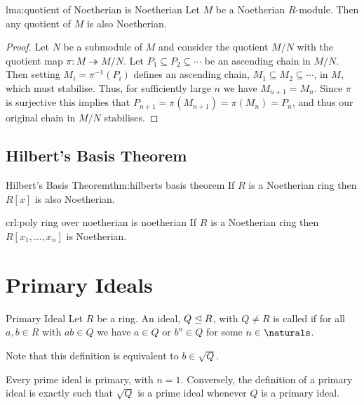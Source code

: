 \begin{lma}{}{lma:quotient of Noetherian is Noetherian}
    Let \(M\) be a Noetherian \(R\)-module.
    Then any quotient of \(M\) is also Noetherian.
    \begin{proof}
        Let \(N\) be a submodule of \(M\) and consider the quotient \(M/N\) with the quotient map \(\pi \colon M \twoheadrightarrow M/N\).
        Let \(P_1 \subseteq P_2 \subseteq \dotsb\) be an ascending chain in \(M/N\).
        Then setting \(M_i = \pi^{-1}(P_i)\) defines an ascending chain, \(M_1 \subseteq M_2 \subseteq \dotsb\), in \(M\), which must stabilise.
        Thus, for sufficiently large \(n\) we have \(M_{n+1} = M_n\).
        Since \(\pi\) is surjective this implies that \(P_{n+1} = \pi(M_{n+1}) = \pi(M_n) = P_n\), and thus our original chain in \(M/N\) stabilises.
    \end{proof}
\end{lma}

\subsection{Hilbert's Basis Theorem}
\begin{thm}{Hilbert's Basis Theorem}{thm:hilberts basis theorem}
    If \(R\) is a Noetherian ring then \(R[x]\) is also Noetherian.
\end{thm}

\begin{crl}{}{crl:poly ring over noetherian is noetherian}
    If \(R\) is a Noetherian ring then \(R[x_1, \dotsc, x_n]\) is Noetherian.
\end{crl}

\section{Primary Ideals}
\begin{dfn}{Primary Ideal}{}
    Let \(R\) be a ring.
    An ideal, \(Q \trianglelefteq R\), with \(Q \ne R\) is called  if for all \(a, b \in R\) with \(a b \in Q\) we have \(a \in Q\) or \(b^n \in Q\) for some \(n \in \naturals\).
\end{dfn}

Note that this definition is equivalent to \(b \in \sqrt{Q}\).

Every prime ideal is primary, with \(n = 1\).
Conversely, the definition of a primary ideal is exactly such that \(\sqrt{Q}\) is a prime ideal whenever \(Q\) is a primary ideal.

